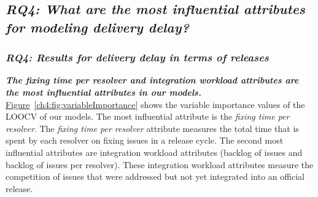 \subsection*{\textit{\textbf{RQ4: What are the most influential attributes for
modeling delivery delay?}}}

\subsubsection*{\textit{\textbf{RQ4: Results for delivery delay in terms of
releases}}}

\noindent\textit{\textbf{The fixing time per resolver and integration workload
attributes are the most influential attributes in our models.}}
\hyperref[ch4:fig:variableImportance]{Figure}~\ref{ch4:fig:variableImportance} shows the
variable importance values of the LOOCV of our models. The most influential
attribute is the \textit{fixing time per resolver}. The \textit{fixing time per
resolver} attribute measures the total time that is spent by each resolver on
fixing issues in a release cycle. The second most influential attributes are
integration workload attributes (\ie backlog of issues and backlog of issues per
resolver). These integration workload attributes measure the competition of
issues that were addressed but not yet integrated into an official release.

